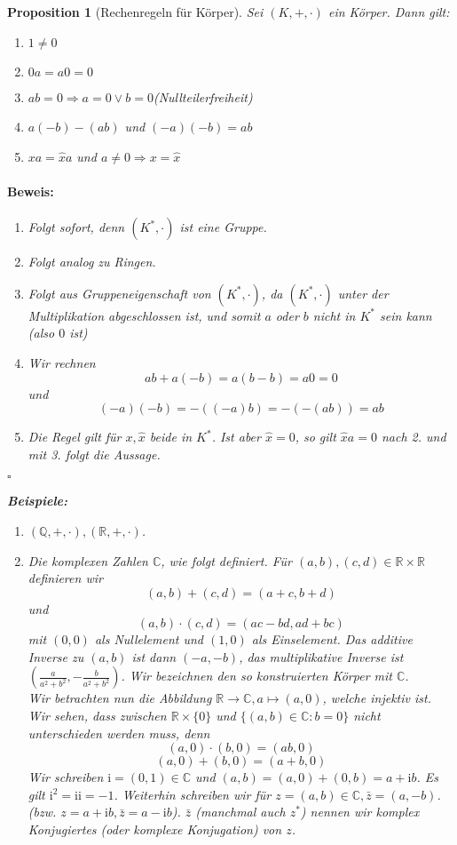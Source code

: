 \documentclass{report}
\newcommand{\IN}[1]{\index{#1|BH}}
\newcommand{\ii}{\mathrm{i}}
\newcommand{\R}{\mathbb{R}}
\newcommand{\Q}{\mathbb{Q}}
\newcommand{\C}{\mathbb{C}}
\theoremstyle{customrem}
\theoremstyle{customdef}
\newtheorem{proposition}[definition]{Proposition}
\renewenvironment{proof}{\vspace{-.75cm}\paragraph{Beweis: }}{\vspace{-.5cm}\hfill$\square$}
\begin{document}
	\begin{proposition}[Rechenregeln für Körper]
		Sei $(K, +, \cdot)$ ein Körper. Dann gilt:
		\begin{enumerate}[leftmargin = 4cm, rightmargin = 2cm]
			\itemsep0cm
			\item $1 \neq 0$
			\item $0a = a0 = 0$
			\item $ab = 0 \Rightarrow a = 0 \lor b = 0$\hfill (Nullteilerfreiheit)
			\item $a(-b) -(ab)$ und $(-a)(-b) = ab$
			\item $x a = \hat{x}a$ und $a \neq 0 \Rightarrow x = \hat{x}$
		\end{enumerate}
		\begin{proof}
			\begin{enumerate}
				\item Folgt sofort, denn $(K^\ast, \cdot)$ ist eine Gruppe.
				\item Folgt analog zu Ringen.
				\item Folgt aus Gruppeneigenschaft von $(K^*, \cdot)$, da $(K^*, \cdot)$ unter der Multiplikation abgeschlossen ist, und somit $a$ oder $b$ nicht in $K^\ast$ sein kann (also $0$ ist)
				\item Wir rechnen 
					$$ab + a(-b) = a (b - b) = a 0 = 0$$
					und
					$$(-a)(-b) = -((-a)b) = -(-(ab)) = ab$$
				\item Die Regel gilt für $x, \hat{x}$ beide in $K^\ast$. Ist aber $\hat{x} = 0$, so gilt $\hat{x}a = 0$ nach 2. und mit 3. folgt die Aussage.
			\end{enumerate}
		\end{proof}
		
		
		\noindent\textbf{Beispiele:}
		\begin{enumerate}
			\item$(\Q, +, \cdot), (\R, +, \cdot)$.
			\item \IN{Zahlen!Komplexe}
				Die komplexen Zahlen $\C$, wie folgt definiert. Für $(a, b), (c, d) \in \R \times \R$ definieren wir
				$$(a, b)+(c, d) = (a + c, b + d)$$ und
				$$(a,b)\cdot (c,d) = (ac-bd, ad + bc)$$
				mit $(0, 0)$ als Nullelement und $(1, 0)$ als Einselement. Das additive Inverse zu $(a, b)$ ist dann $(-a, -b)$, das multiplikative Inverse ist $\left(\frac{a}{a^2+b^2}, -\frac{b}{a^2 + b^2}\right)$. Wir bezeichnen den so konstruierten Körper mit $\C$.\\
				
				Wir betrachten nun die Abbildung $\R \to \C, a \mapsto (a, 0)$, welche injektiv ist. Wir sehen, dass zwischen $\R \times \{0\}$ und $\{(a, b) \in \C : b = 0\}$ nicht unterschieden werden muss, denn 
				$$(a, 0)\cdot(b, 0) = (ab, 0)$$
				$$(a, 0) + (b, 0) =  (a+b, 0)$$
				Wir schreiben $\ii = (0, 1) \in \C$ und $(a, b) = (a, 0) + (0, b) = a + \ii b$. Es gilt $\ii^2 = \ii\ii = -1$. Weiterhin schreiben wir  für $z = (a, b) \in \C, \bar{z} = (a, -b)$. (bzw. $z = a + \ii b, \bar{z} = a - \ii b$). $\bar{z}$ (manchmal auch $z^\ast$) nennen wir komplex Konjugiertes (oder komplexe Konjugation) von $z$.\\
				

\end{enumerate}
\end{proposition}
\end{document}
